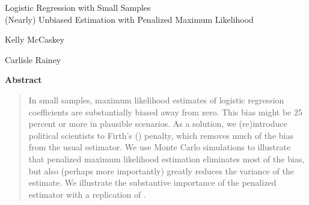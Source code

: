 \documentclass[12pt]{article}
\begin{document}
\begin{center}
{\LARGE Logistic Regression with Small Samples}\\\vspace{2mm}
{\large (Nearly) Unbiased Estimation with Penalized Maximum Likelihood}\\\vspace{2mm}

\vspace{10mm}

Kelly McCaskey

\vspace{3mm}

Carlisle Rainey
\end{center}

\vspace{10mm}

{\centerline{\textbf{Abstract}}}
\begin{quote}\noindent
In small samples, maximum likelihood estimates of logistic regression coefficients are substantially biased away from zero. 
This bias might be 25 percent or more in plausible scenarios. 
As a solution, we (re)introduce political scientists to Firth's (\citeyear{Firth1993}) penalty, which removes much of the bias from the usual estimator. 
We use Monte Carlo simulations to illustrate that penalized maximum likelihood estimation eliminates most of the bias, but also (perhaps more importantly) greatly reduces the variance of the estimate. 
We illustrate the substantive importance of the penalized estimator with a replication of \cite{Weisiger2014}.
 \end{quote}

\thispagestyle{empty}

\newpage
\doublespace
\end{document}
